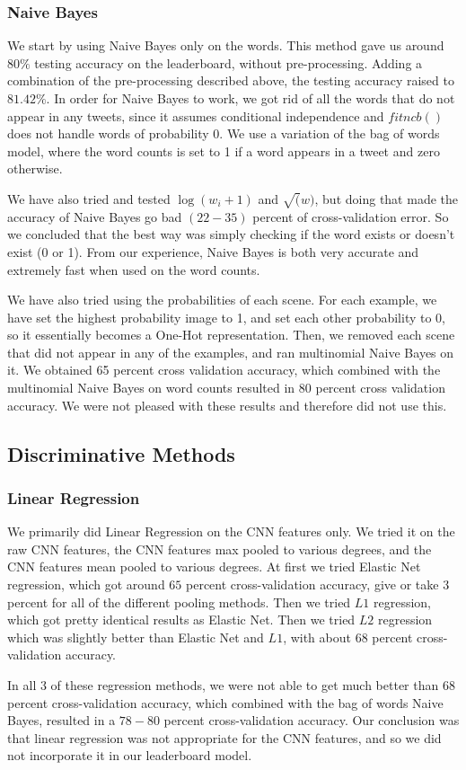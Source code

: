 \documentclass[11pt,twocolumn]{report}
\begin{document}
    \subsubsection{Naive Bayes}
    We start by using Naive Bayes only on the words. This method gave us around $80 \%$ testing accuracy on the leaderboard, without pre-processing. Adding a combination of the pre-processing described above, the testing accuracy raised to $81.42\%$. In order for Naive Bayes to work, we got rid of all the words that do not appear in any tweets, since it assumes conditional independence and $fitncb()$ does not handle words of probability $0$. We use a variation of the bag of words model, where the word counts is set to 1 if a word appears in a tweet and zero otherwise.
    \par
    We have also tried and tested $\log(w_i + 1)$ and $\sqrt(w)$, but doing that made the accuracy of Naive Bayes go bad $(22-35)$ percent of cross-validation error. So we concluded that the best way was simply checking if the word exists or doesn't exist (0 or 1). From our experience, Naive Bayes is both very accurate and extremely fast when used on the word counts.   
    \par
    We have also tried using the probabilities of each scene. For each example, we have set the highest probability image to 1, and set each other probability to 0, so it essentially becomes a One-Hot representation. Then, we removed each scene that did not appear in any of the examples, and ran multinomial Naive Bayes on it. We obtained 65 percent cross validation accuracy, which combined with the multinomial Naive Bayes on word counts resulted in 80 percent cross validation accuracy. We were not pleased with these results and therefore did not use this. 
   
    \subsection*{Discriminative Methods}

    \subsubsection{Linear Regression}
	We primarily did Linear Regression on the CNN features only. We tried it on the raw CNN features, the CNN features max pooled to various degrees, and the CNN features mean pooled to various degrees. At first we tried Elastic Net regression, which got around $65$ percent cross-validation accuracy, give or take $3$ percent for all of the different pooling methods. Then we tried $L1$ regression, which got pretty identical results as Elastic Net. Then we tried $L2$ regression which was slightly better than Elastic Net and $L1$, with about $68$ percent cross-validation accuracy.
    \par
    In all 3 of these regression methods, we were not able to get much better than $68$ percent cross-validation accuracy, which combined with the bag of words Naive Bayes, resulted in a $78-80$ percent cross-validation accuracy. Our conclusion was that linear regression was not appropriate for the CNN features, and so we did not incorporate it in our leaderboard model. 
    
\end{document}
